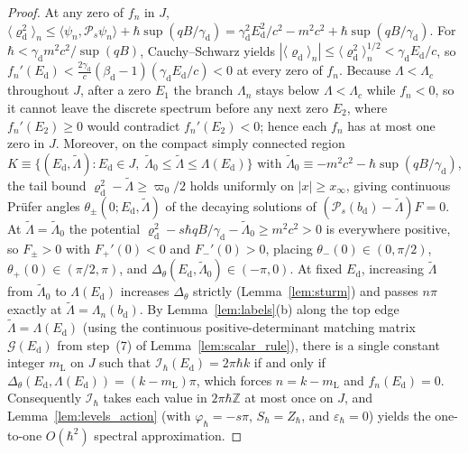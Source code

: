 \documentclass[aps,prd,onecolumn,tightenlines,nofootinbib,notitlepage,11pt,floatfix]{revtex4-2}
\theoremstyle{indentedtheorem}
\begin{document}
\begin{proof}
At any zero of $f_n$ in $J$, $\langle\varrho_\text{d}^2\rangle_n \le \langle\psi_n,\mathcal{P}_s\psi_n\rangle + \hbar\sup(qB/\gamma_\text{d}) = \gamma_\text{d}^2E_\text{d}^2/c^2 - m^2c^2 + \hbar\sup(qB/\gamma_\text{d})$. For $\hbar<\gamma_\text{d}m^2c^2/\sup(qB)$, Cauchy--Schwarz yields $|\langle\varrho_\text{d}\rangle_n|\le\langle\varrho_\text{d}^2\rangle_n^{1/2}<\gamma_\text{d}E_\text{d}/c$, so $f_n'(E_\text{d}) < \frac{2\gamma_\text{d}}{c}(\beta_\text{d}-1)(\gamma_\text{d}E_\text{d}/c) < 0$ at every zero of $f_n$. Because $\Lambda<\Lambda_c$ throughout $J$, after a zero $E_1$ the branch $\Lambda_n$ stays below $\Lambda<\Lambda_c$ while $f_n<0$, so it cannot leave the discrete spectrum before any next zero $E_2$, where $f_n'(E_2)\ge 0$ would contradict $f_n'(E_2)<0$; hence each $f_n$ has at most one zero in $J$. Moreover, on the compact simply connected region $K\equiv\{(E_\text{d},\tilde{\Lambda}):E_\text{d}\in J,\;\tilde{\Lambda}_0\le\tilde{\Lambda}\le\Lambda(E_\text{d})\}$ with $\tilde{\Lambda}_0\equiv -m^2c^2-\hbar\sup(qB/\gamma_\text{d})$, the tail bound $\varrho_\text{d}^2-\tilde{\Lambda}\ge\varpi_0/2$ holds uniformly on $|x|\ge x_\infty$, giving continuous Pr\"ufer angles $\theta_\pm(0;E_\text{d},\tilde{\Lambda})$ of the decaying solutions of $(\mathcal{P}_s(b_\text{d})-\tilde{\Lambda})F=0$. At $\tilde{\Lambda}=\tilde{\Lambda}_0$ the potential $\varrho_\text{d}^2-s\hbar qB/\gamma_\text{d}-\tilde{\Lambda}_0\ge m^2c^2>0$ is everywhere positive, so $F_\pm>0$ with $F_+'(0)<0$ and $F_-'(0)>0$, placing $\theta_-(0)\in(0,\pi/2)$, $\theta_+(0)\in(\pi/2,\pi)$, and $\Delta_\theta(E_\text{d},\tilde{\Lambda}_0)\in(-\pi,0)$. At fixed $E_\text{d}$, increasing $\tilde{\Lambda}$ from $\tilde{\Lambda}_0$ to $\Lambda(E_\text{d})$ increases $\Delta_\theta$ strictly (Lemma~\ref{lem:sturm}) and passes $n\pi$ exactly at $\tilde{\Lambda}=\Lambda_n(b_\text{d})$. By Lemma~\ref{lem:labels}(b) along the top edge $\tilde{\Lambda}=\Lambda(E_\text{d})$ (using the continuous positive-determinant matching matrix $\mathcal{G}(E_\text{d})$ from step~(7) of Lemma~\ref{lem:scalar_rule}), there is a single constant integer $m_\text{L}$ on $J$ such that $\mathcal{I}_\hbar(E_\text{d})=2\pi\hbar k$ if and only if $\Delta_\theta(E_\text{d},\Lambda(E_\text{d}))=(k-m_\text{L})\pi$, which forces $n=k-m_\text{L}$ and $f_n(E_\text{d})=0$. Consequently $\mathcal{I}_\hbar$ takes each value in $2\pi\hbar\mathbb{Z}$ at most once on $J$, and Lemma~\ref{lem:levels_action} (with $\varphi_\hbar=-s\pi$, $S_\hbar=Z_\hbar$, and $\varepsilon_\hbar=0$) yields the one-to-one $O(\hbar^2)$ spectral approximation.


\end{proof}
\end{document}

